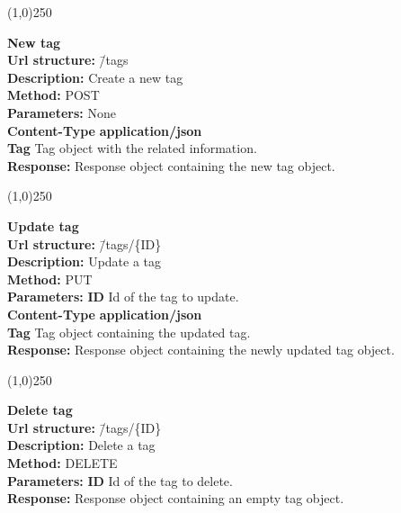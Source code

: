 \documentclass[11pt]{article}
\begin{document}
\begin{center}\line(1,0){250}\end{center}

\begin{tabbing}
\textbf{New tag} \\
\textcolor{black!60}{\textbf{Url structure:}} \hspace{0.2in} \= /tags \\
\textcolor{black!60}{\textbf{Description:}}  \> Create a new tag \\
\textcolor{black!60}{\textbf{Method:}} \> POST \\
\textcolor{black!60}{\textbf{Parameters:}} \> None \\
\textcolor{black!60}{\textbf{Content-Type}} \> \textbf{application/json} \\
\> \textbf{Tag} Tag object with the related information. \\
\textcolor{black!60}{\textbf{Response:}} \> Response object containing the new tag object.
\end{tabbing}

\begin{center}\line(1,0){250}\end{center}

\begin{tabbing}
\textbf{Update tag} \\
\textcolor{black!60}{\textbf{Url structure:}} \hspace{0.2in} \= /tags/\{ID\} \\
\textcolor{black!60}{\textbf{Description:}}  \> Update a tag \\
\textcolor{black!60}{\textbf{Method:}} \> PUT \\
\textcolor{black!60}{\textbf{Parameters:}} \> \textbf{ID} Id of the tag to update. \\
\textcolor{black!60}{\textbf{Content-Type}} \> \textbf{application/json} \\
\> \textbf{Tag} Tag object containing the updated tag.\\
\textcolor{black!60}{\textbf{Response:}} \> Response object containing the newly updated tag object.
\end{tabbing}

\begin{center}\line(1,0){250}\end{center}

\begin{tabbing}
\textbf{Delete tag} \\
\textcolor{black!60}{\textbf{Url structure:}} \hspace{0.2in} \= /tags/\{ID\} \\
\textcolor{black!60}{\textbf{Description:}}  \> Delete a tag \\
\textcolor{black!60}{\textbf{Method:}} \> DELETE \\
\textcolor{black!60}{\textbf{Parameters:}} \> \textbf{ID} Id of the tag to delete. \\
\textcolor{black!60}{\textbf{Response:}} \> Response object containing an empty tag object.
\end{tabbing}
\end{document}
